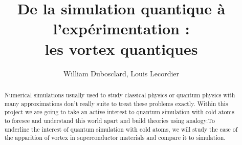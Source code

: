 \documentclass[a4paper]{article}
\title{De la simulation quantique à l'expérimentation : \\ les vortex quantiques}
\author{William Dubosclard, Louis Lecordier}
\begin{document}
\maketitle


\begin{abstract}
Numerical simulations usually used to study classical physics or quantum physics with many approximations don't really suite to treat these problems exactly.
Within this project we are going to take an active interest to quantum simulation with cold atoms to foresee and understand this world apart and build theories using analogy.To underline the interest of quantum simulation with cold atoms, we will study the case of the apparition of vortex in superconductor materials and compare it to simulation.
\end{abstract}

\tableofcontents

\newpage
\end{document}

